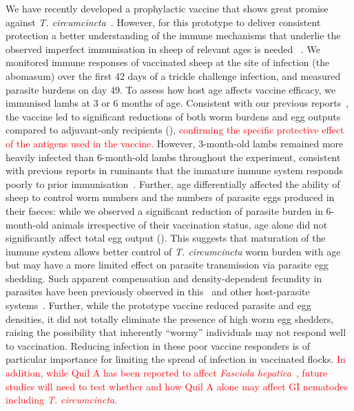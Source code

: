 \documentclass[a4paper, hidelinks, 11pt]{article}
\begin{document}
We have recently developed a prophylactic vaccine that shows great promise
against \emph{T. circumcincta}~\supercite{Nisbet2013}. However, for this
prototype to deliver consistent protection a better understanding of the immune
mechanisms that underlie the observed imperfect immunisation in sheep of
relevant ages is needed ~\supercite{Barnes1995}. We monitored immune responses
of vaccinated sheep at the site of infection (the abomasum) over the first 42
days of a trickle challenge infection, and measured parasite burdens on day 49.
To assess how host age affects vaccine efficacy, we immunised lambs at 3 or 6
months of age. Consistent with our previous reports~\supercite{Nisbet2013,
Nisbet2016}, the vaccine led to significant reductions of both worm burdens and
egg outputs compared to adjuvant-only recipients (),
\textcolor{red}{confirming the specific protective effect of the antigens used
in the vaccine.} However, 3-month-old lambs remained more heavily infected than
6-month-old lambs throughout the experiment, consistent with previous reports in
ruminants that the immature immune system responds poorly to prior
immunisation~\supercite{Smith1985,Corpa2000}. Further, age differentially
affected the ability of sheep to control worm numbers and the numbers of
parasite eggs produced in their faeces: while we observed a significant
reduction of parasite burden in 6-month-old animals irrespective of their
vaccination status, age alone did not significantly affect total egg output
(). This suggests that maturation of the immune system
allows better control of \emph{T. circumcincta} worm burden with age but may
have a more limited effect on parasite transmission via parasite egg shedding.
Such apparent compensation and density-dependent fecundity in parasites have
been previously observed in this~\supercite{Bishop2000} and other host-parasite
systems~\supercite{Churcher2005,Churcher2006,Bleay2007}. Further, while the
prototype vaccine reduced parasite and egg densities, it did not totally
eliminate the presence of high worm egg shedders, raising the possibility that
inherently ``wormy'' individuals may not respond well to vaccination. Reducing
infection in these poor vaccine responders is of particular importance for
limiting the spread of infection in vaccinated flocks. \textcolor{red}{In
addition, while Quil A has been reported to affect \emph{Fasciola
hepatica}~\supercite{Hacariz2009}, future studies will need to test whether and
how Quil A alone may affect GI nematodes including \emph{T. circumcincta}.}
\end{document}
